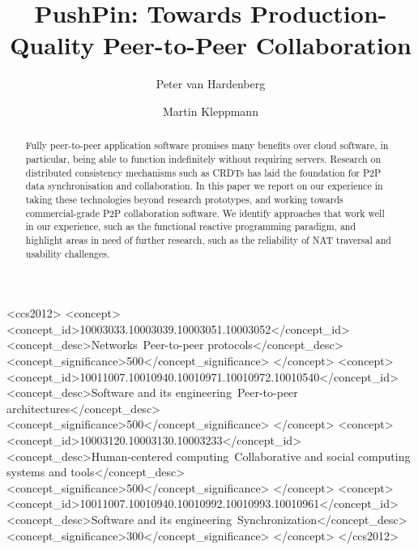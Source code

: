 \documentclass[sigplan,10pt]{acmart}
\begin{document}
\title{PushPin: Towards Production-Quality  Peer-to-Peer Collaboration}

\author{Peter van Hardenberg}

\author{Martin Kleppmann}

\begin{abstract}
Fully peer-to-peer application software promises many benefits over cloud software, in particular, being able to function indefinitely without requiring servers.
Research on distributed consistency mechanisms such as CRDTs has laid the foundation for P2P data synchronisation and collaboration.
In this paper we report on our experience in taking these technologies beyond research prototypes, and working towards commercial-grade P2P collaboration software.
We identify approaches that work well in our experience, such as the functional reactive programming paradigm, and highlight areas in need of further research, such as the reliability of NAT traversal and usability challenges.
\end{abstract}

\begin{CCSXML}
<ccs2012>
    <concept>
        <concept_id>10003033.10003039.10003051.10003052</concept_id>
        <concept_desc>Networks~Peer-to-peer protocols</concept_desc>
        <concept_significance>500</concept_significance>
    </concept>
    <concept>
        <concept_id>10011007.10010940.10010971.10010972.10010540</concept_id>
        <concept_desc>Software and its engineering~Peer-to-peer architectures</concept_desc>
        <concept_significance>500</concept_significance>
    </concept>
    <concept>
        <concept_id>10003120.10003130.10003233</concept_id>
        <concept_desc>Human-centered computing~Collaborative and social computing systems and tools</concept_desc>
        <concept_significance>500</concept_significance>
    </concept>
    <concept>
        <concept_id>10011007.10010940.10010992.10010993.10010961</concept_id>
        <concept_desc>Software and its engineering~Synchronization</concept_desc>
        <concept_significance>300</concept_significance>
    </concept>
</ccs2012>
\end{CCSXML}
\end{document}
